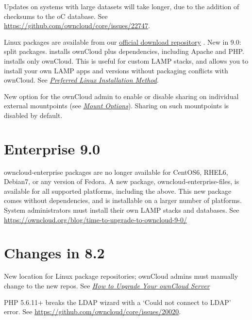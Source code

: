 \documentclass[letterpaper,10pt,english]{sphinxmanual}
\begin{document}
Updates on systems with large datasets will take longer, due to the addition of checksums to the
oC database. See \href{https://github.com/owncloud/core/issues/22747}{https://github.com/owncloud/core/issues/22747}.

Linux packages are available from our \href{https://download.owncloud.org/download/repositories/stable/owncloud/}{official download repository} .
New in 9.0: split packages.  installs ownCloud plus dependencies, including Apache
and PHP.  installs only ownCloud. This is useful for custom LAMP stacks, and
allows you to install your own LAMP apps and versions without packaging conflicts with ownCloud.
See {\hyperref[installation/linux_installation::doc]{\emph{Preferred Linux Installation Method}}}.

New option for the ownCloud admin to enable or disable sharing on individual external mountpoints
(see {\hyperref[configuration_files/external_storage_configuration_gui:external-storage-mount-options-label]{\emph{Mount Options}}}). Sharing on such mountpoints is disabled by default.


\section{Enterprise 9.0}
\label{release_notes:enterprise-9-0}
owncloud-enterprise packages are no longer available for CentOS6, RHEL6,
Debian7, or any version of Fedora. A new package, owncloud-enterprise-files, is available for all supported platforms, including the above. This new package comes without dependencies, and is installable on a larger number of platforms. System administrators must install their own LAMP stacks and databases. See \href{https://owncloud.org/blog/time-to-upgrade-to-owncloud-9-0/}{https://owncloud.org/blog/time-to-upgrade-to-owncloud-9-0/}


\section{Changes in 8.2}
\label{release_notes:changes-in-8-2}
New location for Linux package repositories; ownCloud admins must manually
change to the new repos. See {\hyperref[maintenance/upgrade::doc]{\emph{How to Upgrade Your ownCloud Server}}}

PHP 5.6.11+ breaks the LDAP wizard with a `Could not connect to LDAP' error. See \href{https://github.com/owncloud/core/issues/20020}{https://github.com/owncloud/core/issues/20020}.
\end{document}
